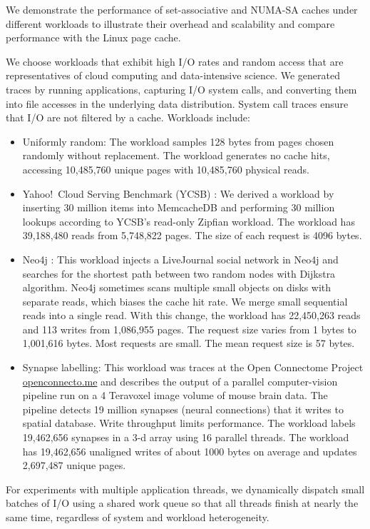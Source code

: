 We demonstrate the performance of set-associative and NUMA-SA caches under different
workloads to illustrate their overhead and scalability and compare
performance with the Linux page cache.

We choose workloads that exhibit high I/O rates and random access
that are representatives of cloud computing and data-intensive science.
We generated traces by running applications, capturing I/O system calls, and converting 
them into file accesses in the underlying data distribution.  System call traces 
ensure that I/O are not filtered by a cache.  Workloads include:

\vspace{-10pt}

\begin{itemize}
\addtolength{\itemsep}{-5pt}
\item Uniformly random: The workload samples 128 bytes from pages chosen
  randomly without replacement.  The workload generates no cache hits, 
	accessing 10,485,760 unique pages with 10,485,760 physical reads.
\item Yahoo!~Cloud Serving Benchmark (YCSB) \cite{ycsb}:  We derived a 
  workload by inserting 30 million items into MemcacheDB 
  and performing 30 million lookups according to YCSB's read-only Zipfian workload.
	The workload has 39,188,480 reads from 5,748,822 pages. The size of each
	request is 4096 bytes.  
\item Neo4j \cite{neo4j}: This workload injects a LiveJournal social
	network \cite{livejournal} in Neo4j and searches for the shortest path
	between two random nodes with Dijkstra algorithm. 
 Neo4j sometimes scans multiple small objects on disks with separate reads, which biases 
 the cache hit rate.   We merge small sequential reads into
	a single read. With this change, the workload has 22,450,263 reads and
	113 writes from 1,086,955 pages. The request size varies from 1 bytes
	to 1,001,616 bytes. Most requests are small.  The mean request size
	is 57 bytes.
\item Synapse labelling: This workload was traces at the Open Connectome Project \url{openconnecto.me}
  and describes the output of a parallel computer-vision pipeline run on a 4 Teravoxel image volume of 
  mouse brain data.  The pipeline detects 19 million synapses (neural connections) that it writes to 
  spatial database.  Write throughput limits performance.  The workload labels 19,462,656 synapses in a 
  3-d array 
  using 16 parallel threads.  The workload has 19,462,656 unaligned writes of about 1000 bytes on average
  and updates 2,697,487 unique pages.
\end{itemize}
\vspace{-10pt}
For experiments with multiple application threads, we dynamically dispatch 
small batches of I/O using a shared work queue so that all threads finish at 
nearly the same time, regardless of system and workload heterogeneity.

